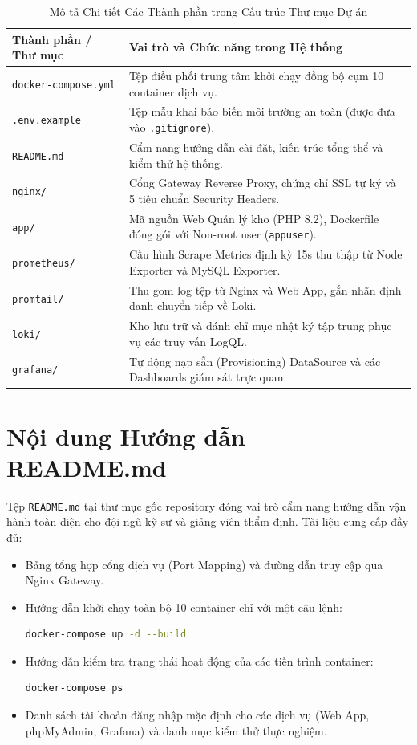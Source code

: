 \documentclass[12pt,a4paper,oneside]{report}
\begin{document}
\begin{table}[H]
\centering
\small
\renewcommand{\arraystretch}{1.25}
\begin{tabularx}{\linewidth}{|l|X|}
\hline
\rowcolor{codebg}
\textbf{Thành phần / Thư mục} & \textbf{Vai trò và Chức năng trong Hệ thống} \\
\hline
\texttt{docker-compose.yml} & Tệp điều phối trung tâm khởi chạy đồng bộ cụm 10 container dịch vụ. \\
\hline
\texttt{.env.example} & Tệp mẫu khai báo biến môi trường an toàn (được đưa vào \texttt{.gitignore}). \\
\hline
\texttt{README.md} & Cẩm nang hướng dẫn cài đặt, kiến trúc tổng thể và kiểm thử hệ thống. \\
\hline
\texttt{nginx/} & Cổng Gateway Reverse Proxy, chứng chỉ SSL tự ký và 5 tiêu chuẩn Security Headers. \\
\hline
\texttt{app/} & Mã nguồn Web Quản lý kho (PHP 8.2), Dockerfile đóng gói với Non-root user (\texttt{appuser}). \\
\hline
\texttt{prometheus/} & Cấu hình Scrape Metrics định kỳ 15s thu thập từ Node Exporter và MySQL Exporter. \\
\hline
\texttt{promtail/} & Thu gom log tệp từ Nginx và Web App, gắn nhãn định danh chuyển tiếp về Loki. \\
\hline
\texttt{loki/} & Kho lưu trữ và đánh chỉ mục nhật ký tập trung phục vụ các truy vấn LogQL. \\
\hline
\texttt{grafana/} & Tự động nạp sẵn (Provisioning) DataSource và các Dashboards giám sát trực quan. \\
\hline
\end{tabularx}
\caption{Mô tả Chi tiết Các Thành phần trong Cấu trúc Thư mục Dự án}
\label{tab:project_structure}
\end{table}

\section{Nội dung Hướng dẫn README.md}
Tệp \texttt{README.md} tại thư mục gốc repository đóng vai trò cẩm nang hướng dẫn vận hành toàn diện cho đội ngũ kỹ sư và giảng viên thẩm định. Tài liệu cung cấp đầy đủ:
\begin{itemize}
    \item Bảng tổng hợp cổng dịch vụ (Port Mapping) và đường dẫn truy cập qua Nginx Gateway.
    \item Hướng dẫn khởi chạy toàn bộ 10 container chỉ với một câu lệnh:
    \begin{lstlisting}[language=bash]
docker-compose up -d --build
    \end{lstlisting}
    \item Hướng dẫn kiểm tra trạng thái hoạt động của các tiến trình container:
    \begin{lstlisting}[language=bash]
docker-compose ps
    \end{lstlisting}
    \item Danh sách tài khoản đăng nhập mặc định cho các dịch vụ (Web App, phpMyAdmin, Grafana) và danh mục kiểm thử thực nghiệm.
\end{itemize}
\end{document}
